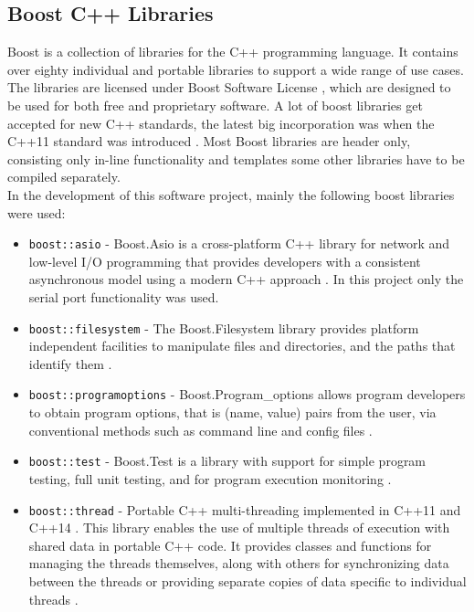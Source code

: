 \subsection{Boost C++ Libraries}
Boost \cite{boost} is a collection of libraries for the C++ programming language. It contains over eighty individual and portable libraries to support a wide range of use cases. %
The libraries are licensed under Boost Software License \cite{boostliz}, which are designed to be used for both free and proprietary software. A lot of boost libraries get accepted for new C++ standards, the latest big incorporation was when the C++11 standard was introduced \cite{booststd}. Most Boost libraries are header only, consisting only in-line functionality and templates some other libraries have to be compiled separately.\\
In the development of this software project, mainly the following boost libraries were used:
\begin{itemize}
\item \texttt{boost::asio} - Boost.Asio is a cross-platform C++ library for network and low-level I/O programming that provides developers with a consistent asynchronous model using a modern C++ approach \cite{boost_asio}. In this project only the serial port functionality was used.
\item \texttt{boost::filesystem} - The Boost.Filesystem library provides platform independent facilities to manipulate files and directories, and the paths that identify them \cite{boost_files}.
\item \texttt{boost::programoptions} - Boost.Program\_options allows program developers to obtain program options, that is (name, value) pairs from the user, via conventional methods such as command line and config files \cite{boost_po}. 
\item \texttt{boost::test} - Boost.Test is a library with support for simple program testing, full unit testing, and for program execution monitoring \cite{boost_test}.
\item \texttt{boost::thread} - Portable C++ multi-threading implemented in C++11 \cite{cpp_11} and C++14 \cite{cpp_14}. This library  enables the use of multiple threads of execution with shared data in portable C++ code. It provides classes and functions for managing the threads themselves, along with others for synchronizing data between the threads or providing separate copies of data specific to individual threads \cite{boost_thread}. 
\end{itemize}
